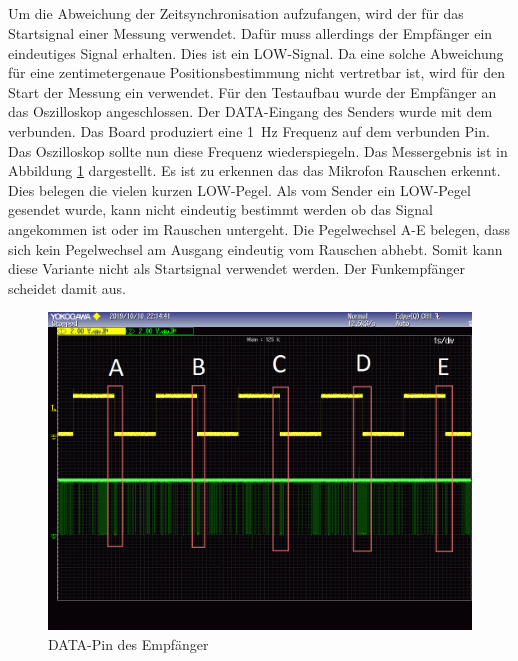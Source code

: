 \subsection{\funkempfaenger}
Um die Abweichung der Zeitsynchronisation aufzufangen, wird der \funkempfaenger \platz für das Startsignal einer Messung verwendet. Dafür muss allerdings der Empfänger ein eindeutiges Signal erhalten. Dies ist ein \si{LOW}-Signal. Da eine solche Abweichung für eine zentimetergenaue Positionsbestimmung nicht vertretbar ist, wird für den Start der Messung ein \funkempfaenger \platz verwendet. Für den Testaufbau wurde der Empfänger an das Oszilloskop angeschlossen. Der \si{DATA}-Eingang des Senders wurde mit dem \board \platz verbunden. Das Board produziert eine \SI{1}{\hertz} Frequenz auf dem verbunden Pin. Das Oszilloskop sollte nun diese Frequenz wiederspiegeln. Das Messergebnis ist in Abbildung \ref{img:ausgang_sender_pin} dargestellt. Es ist zu erkennen das das Mikrofon Rauschen erkennt. Dies belegen die vielen kurzen \si{LOW}-Pegel. Als vom Sender ein \si{LOW}-Pegel gesendet wurde, kann nicht eindeutig bestimmt werden ob das Signal angekommen ist oder im Rauschen untergeht. Die Pegelwechsel A-E belegen, dass sich kein Pegelwechsel am Ausgang eindeutig vom Rauschen abhebt. Somit kann diese Variante nicht als Startsignal verwendet werden. Der Funkempfänger scheidet damit aus.

\begin{figure}[H]
        \centering
        \hspace*{-1.7cm}
        \includegraphics[width=1.2\textwidth]{images/schmitt_trigger_billig_sender_bearbeitet.png}
        \caption{\si{DATA}-Pin des \funkempfaenger \platz Empfänger}    
        \label{img:ausgang_sender_pin}
\end{figure}

